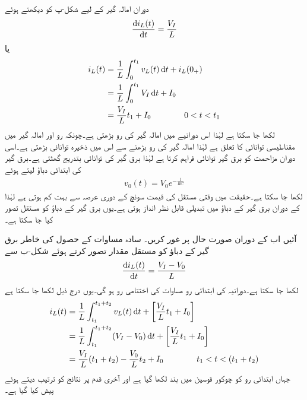 دوران  امالہ گیر کے لیے  شکل-پ کو دیکھتے ہوئے 
\begin{align*}
\frac{\dif i_L(t)}{\dif t}=\frac{V_I}{L}
\end{align*}
یا
\begin{gather}
\begin{aligned}\label{مساوات_عارضی_بڑھاتا_منبع_دباو_الف}
i_L(t)&=\frac{1}{L} \int_{0}^{t_1} v_L(t) \dif t+i_L(0_+)\\
&=\frac{1}{L}\int_{0}^{t_1} V_I \dif t+I_0\\
&=\frac{V_I}{L} t_1+I_0\quad \quad \quad \quad 0<t<t_1
\end{aligned}
\end{gather}
لکھا جا سکتا ہے لہٰذا اس دورانیے میں امالہ گیر کی رو بڑھتی ہے۔چونکہ  رو اور امالہ گیر میں مقناطیسی توانائی کا تعلق  ہے لہٰذا امالہ گیر کی رو بڑھنے سے اس میں ذخیرہ توانائی بڑھتی ہے۔اسی دوران مزاحمت  کو برق گیر توانائی فراہم کرتا ہے لہٰذا برق گیر کی توانائی بتدریج گھٹتی ہے۔برق گیر کی ابتدائی دباؤ  لیتے ہوئے 
\begin{align*}
v_0(t)=V_0 e^{-\frac{t}{RC}}
\end{align*}
لکھا جا سکتا ہے۔حقیقت میں  وقتی مستقل کی قیمت سوئچ کے دوری عرصہ  سے  بہت کم  ہوتی ہے  لہٰذا  کے دوران برق گیر کے دباؤ میں تبدیلی قابل نظر انداز ہوتی ہے۔یوں برق گیر کے دباؤ کو مستقل تصور کیا جا سکتا ہے۔

آئیں اب  کے دوران صورت حال پر غور کریں۔ سادہ مساوات کے حصول کی خاطر برق گیر کے دباؤ کو مستقل مقدار  تصور کرتے  ہوئے شکل-ب  سے
\begin{align*}
\frac{\dif i_L(t)}{\dif t}=\frac{V_I-V_0}{L}
\end{align*}
لکھا جا سکتا ہے۔دورانیہ  کی ابتدائی رو مساوات  کی اختتامی رو ہو گی۔یوں درج ذیل لکھا جا سکتا ہے 
\begin{gather}
\begin{aligned}\label{مساوات_عارضی_بڑھاتا_منبع_دباو_ب}
i_L(t)&=\frac{1}{L}\int_{t_1}^{t_1+t_2} v_L(t) \dif t+\left[\frac{V_I}{L} t_1+I_0\right]\\
&=\frac{1}{L}\int_{t_1}^{t_1+t_2}(V_I-V_0)\dif t+\left[\frac{V_I}{L} t_1+I_0\right]\\
&=\frac{V_I}{L}(t_1+t_2)-\frac{V_0}{L}t_2+I_0 \quad \quad \quad \quad t_1<t<(t_1+t_2)
\end{aligned}
\end{gather}
جہاں ابتدائی رو کو چوکور قوسین میں بند لکھا گیا ہے اور آخری قدم پر نتائج کو ترتیب دیتے ہوئے پیش کیا گیا ہے۔


